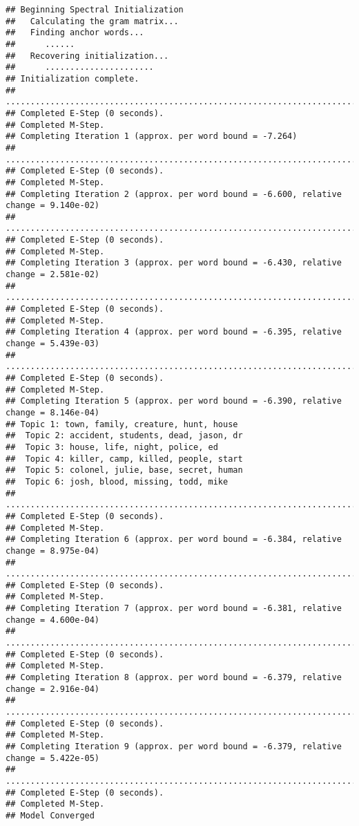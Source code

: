 \documentclass[
]{article}
\begin{document}
\begin{verbatim}
## Beginning Spectral Initialization 
##   Calculating the gram matrix...
##   Finding anchor words...
##      ......
##   Recovering initialization...
##      ......................
## Initialization complete.
## ....................................................................................................
## Completed E-Step (0 seconds). 
## Completed M-Step. 
## Completing Iteration 1 (approx. per word bound = -7.264) 
## ....................................................................................................
## Completed E-Step (0 seconds). 
## Completed M-Step. 
## Completing Iteration 2 (approx. per word bound = -6.600, relative change = 9.140e-02) 
## ....................................................................................................
## Completed E-Step (0 seconds). 
## Completed M-Step. 
## Completing Iteration 3 (approx. per word bound = -6.430, relative change = 2.581e-02) 
## ....................................................................................................
## Completed E-Step (0 seconds). 
## Completed M-Step. 
## Completing Iteration 4 (approx. per word bound = -6.395, relative change = 5.439e-03) 
## ....................................................................................................
## Completed E-Step (0 seconds). 
## Completed M-Step. 
## Completing Iteration 5 (approx. per word bound = -6.390, relative change = 8.146e-04) 
## Topic 1: town, family, creature, hunt, house 
##  Topic 2: accident, students, dead, jason, dr 
##  Topic 3: house, life, night, police, ed 
##  Topic 4: killer, camp, killed, people, start 
##  Topic 5: colonel, julie, base, secret, human 
##  Topic 6: josh, blood, missing, todd, mike 
## ....................................................................................................
## Completed E-Step (0 seconds). 
## Completed M-Step. 
## Completing Iteration 6 (approx. per word bound = -6.384, relative change = 8.975e-04) 
## ....................................................................................................
## Completed E-Step (0 seconds). 
## Completed M-Step. 
## Completing Iteration 7 (approx. per word bound = -6.381, relative change = 4.600e-04) 
## ....................................................................................................
## Completed E-Step (0 seconds). 
## Completed M-Step. 
## Completing Iteration 8 (approx. per word bound = -6.379, relative change = 2.916e-04) 
## ....................................................................................................
## Completed E-Step (0 seconds). 
## Completed M-Step. 
## Completing Iteration 9 (approx. per word bound = -6.379, relative change = 5.422e-05) 
## ....................................................................................................
## Completed E-Step (0 seconds). 
## Completed M-Step. 
## Model Converged
\end{verbatim}
\end{document}

